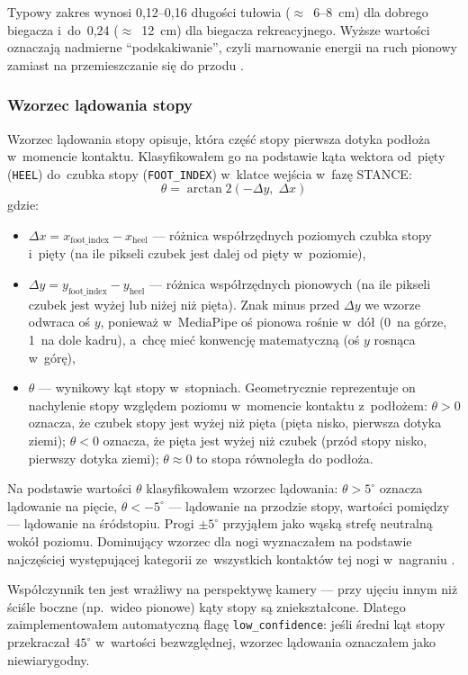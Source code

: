 Typowy zakres wynosi 0{,}12--0{,}16 długości tułowia ($\approx$~6--8~cm) dla dobrego biegacza i~do~0{,}24 ($\approx$~12~cm) dla biegacza rekreacyjnego. Wyższe wartości oznaczają nadmierne ``podskakiwanie'', czyli marnowanie energii na ruch pionowy zamiast na przemieszczanie się do przodu \cite{novacheck1998}.

\subsubsection{Wzorzec lądowania stopy}

Wzorzec lądowania stopy opisuje, która część stopy pierwsza dotyka podłoża w~momencie kontaktu. Klasyfikowałem go na podstawie kąta wektora od~pięty (\texttt{HEEL}) do~czubka stopy (\texttt{FOOT\_INDEX}) w~klatce wejścia w~fazę STANCE:
\[
\theta = \arctan2(-\Delta y,\; \Delta x)
\]
gdzie:
\begin{itemize}
    \item $\Delta x = x_{\text{foot\_index}} - x_{\text{heel}}$ --- różnica współrzędnych poziomych czubka stopy i~pięty (na ile pikseli czubek jest dalej od pięty w~poziomie),
    \item $\Delta y = y_{\text{foot\_index}} - y_{\text{heel}}$ --- różnica współrzędnych pionowych (na ile pikseli czubek jest wyżej lub niżej niż pięta). Znak minus przed $\Delta y$ we wzorze odwraca oś $y$, ponieważ w~MediaPipe oś pionowa rośnie w~dół (0~na górze, 1~na dole kadru), a~chcę mieć konwencję matematyczną (oś $y$ rosnąca w~górę),
    \item $\theta$ --- wynikowy kąt stopy w~stopniach. Geometrycznie reprezentuje on nachylenie stopy względem poziomu w~momencie kontaktu z~podłożem: $\theta > 0$ oznacza, że czubek stopy jest wyżej niż pięta (pięta nisko, pierwsza dotyka ziemi); $\theta < 0$ oznacza, że pięta jest wyżej niż czubek (przód stopy nisko, pierwszy dotyka ziemi); $\theta \approx 0$ to stopa równoległa do podłoża.
\end{itemize}

Na podstawie wartości $\theta$ klasyfikowałem wzorzec lądowania: $\theta > 5^\circ$ oznacza lądowanie na pięcie, $\theta < -5^\circ$ --- lądowanie na przodzie stopy, wartości pomiędzy --- lądowanie na śródstopiu. Progi $\pm  5^\circ$ przyjąłem jako wąską strefę neutralną wokół poziomu. Dominujący wzorzec dla nogi wyznaczałem na podstawie najczęściej występującej kategorii ze~wszystkich kontaktów tej nogi w~nagraniu \cite{daoud2012}.

Współczynnik ten jest wrażliwy na perspektywę kamery --- przy ujęciu innym niż ściśle boczne (np.~wideo pionowe) kąty stopy są zniekształcone. Dlatego zaimplementowałem automatyczną flagę \texttt{low\_confidence}: jeśli średni kąt stopy przekraczał $45^\circ$ w~wartości bezwzględnej, wzorzec lądowania oznaczałem jako niewiarygodny. 

